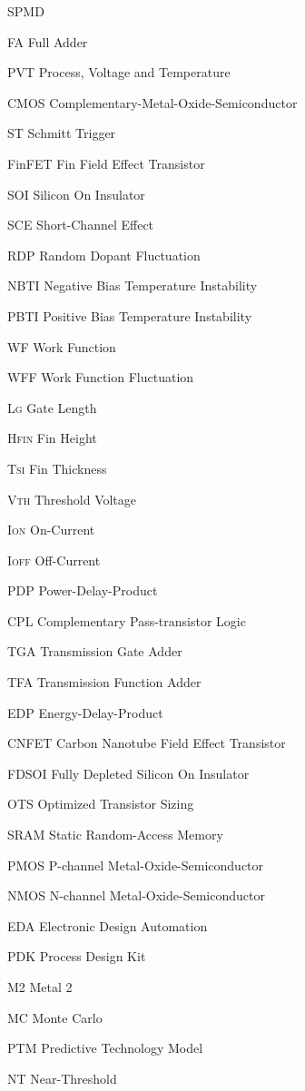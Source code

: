 \documentclass[ecp,tc, english]{iiufrgs}
\begin{document}
\begin{listofabbrv}{SPMD}
        \item[FA] Full Adder
        \item[PVT] Process, Voltage and Temperature
        \item[CMOS] Complementary-Metal-Oxide-Semiconductor
        \item[ST] Schmitt Trigger
        \item[FinFET] Fin Field Effect Transistor
        \item[SOI] Silicon On Insulator
        \item[SCE] Short-Channel Effect
        \item[RDP] Random Dopant Fluctuation
        \item[NBTI] Negative Bias Temperature Instability
        \item[PBTI] Positive Bias Temperature Instability
        \item[WF] Work Function
        \item[WFF] Work Function Fluctuation
        \item[L\textsc{g}] Gate Length
        \item[H\textsc{fin}] Fin Height
        \item[T\textsc{si}] Fin Thickness
        \item[V\textsc{th}] Threshold Voltage
        \item[I\textsc{on}] On-Current
        \item[I\textsc{off}] Off-Current
        \item[PDP] Power-Delay-Product
        \item[CPL] Complementary Pass-transistor Logic
        \item[TGA] Transmission Gate Adder
        \item[TFA] Transmission Function Adder
        \item[EDP] Energy-Delay-Product
        \item[CNFET] Carbon Nanotube Field Effect Transistor
        \item[FDSOI] Fully Depleted Silicon On Insulator
        \item[OTS] Optimized Transistor Sizing
        \item[SRAM] Static Random-Access Memory
        \item[PMOS] P-channel Metal-Oxide-Semiconductor
        \item[NMOS] N-channel Metal-Oxide-Semiconductor
        \item[EDA] Electronic Design Automation
        \item[PDK] Process Design Kit
        \item[M2] Metal 2
        \item[MC] Monte Carlo
        \item[PTM] Predictive Technology Model
        \item[NT] Near-Threshold
\end{listofabbrv}
\end{document}
